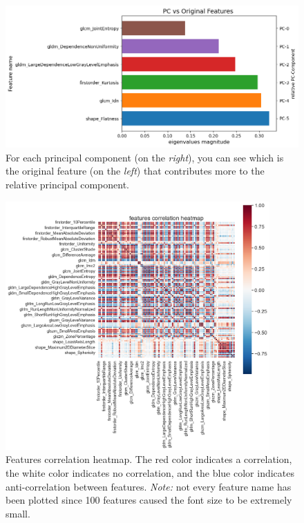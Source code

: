 \documentclass{standalone}
\begin{document}
\begin{figure}[ht]

    
    \includegraphics[width=\textwidth]{../images/importance.png}

    \caption{For each principal component (on the \textit{right}), you can see which is the original feature (on the \textit{left}) that contributes more to the relative principal component.}
    \label{importance}
    
\end{figure}


\begin{figure}[htp]

    \centering
    \includegraphics[width=0.9\textwidth]{../images/heatmap.png}

    \caption{Features correlation heatmap. The red color indicates a correlation, the white color indicates no correlation, and the blue color indicates anti-correlation between features. \textit{Note:} not every feature name has been plotted since 100 features caused the font size to be extremely small.}
    \label{heatmap}
    
    \end{figure}
\end{document}

